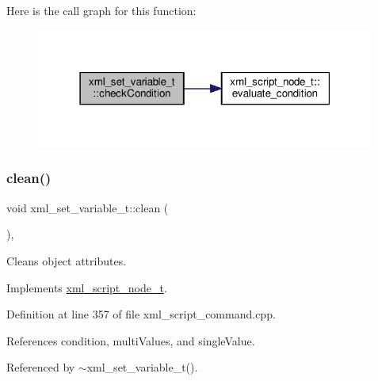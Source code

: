 Here is the call graph for this function\+:
\nopagebreak
\begin{figure}[H]
\begin{center}
\leavevmode
\includegraphics[width=316pt]{dc/db4/classxml__set__variable__t_a85442505ebbf8662f4791b94a52487d4_cgraph}
\end{center}
\end{figure}
\mbox{\label{classxml__set__variable__t_ac31d6bc914adb2a642e69adfabdb5f71}} 
\subsubsection{\texorpdfstring{clean()}{clean()}}
{\footnotesize\ttfamily void xml\+\_\+set\+\_\+variable\+\_\+t\+::clean (\begin{DoxyParamCaption}{ }\end{DoxyParamCaption})\hspace{0.3cm}{\ttfamily [override]}, {\ttfamily [virtual]}}



Cleans object attributes. 



Implements \hyperlink{classxml__script__node__t_a2be778f2caef531c55b36c2bf2c996e2}{xml\+\_\+script\+\_\+node\+\_\+t}.



Definition at line 357 of file xml\+\_\+script\+\_\+command.\+cpp.



References condition, multi\+Values, and single\+Value.



Referenced by $\sim$xml\+\_\+set\+\_\+variable\+\_\+t().

